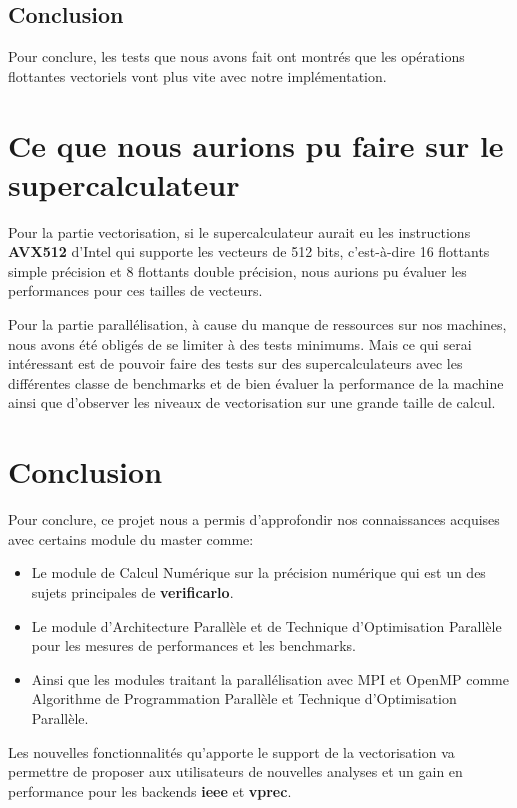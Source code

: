 \documentclass[11pt, letterpaper]{article}
\begin{document}
\subsection{Conclusion}
\label{sec:org1785040}

Pour conclure, les tests que nous avons fait ont montrés que les opérations
flottantes vectoriels vont plus vite avec notre implémentation.

\section{Ce que nous aurions pu faire sur le supercalculateur}
\label{sec:org5a4ae0a}

Pour la partie vectorisation, si le supercalculateur aurait eu les
instructions \textbf{AVX512} d'Intel qui supporte les vecteurs de 512 bits,
c'est-à-dire 16 flottants simple précision et 8 flottants double précision,
nous aurions pu évaluer les performances pour ces tailles de vecteurs.

Pour la partie parallélisation, à cause du manque de ressources sur nos
machines, nous avons été obligés de se limiter à des tests minimums. Mais ce
qui serai intéressant est de pouvoir faire des tests sur des supercalculateurs
avec les différentes classe de benchmarks et de bien évaluer la performance de
la machine ainsi que d'observer les niveaux de vectorisation sur une grande
taille de calcul.

\section{Conclusion}
\label{sec:org4b8e0be}

Pour conclure, ce projet nous a permis d'approfondir nos connaissances acquises
avec certains module du master comme:
\begin{itemize}
\item Le module de Calcul Numérique sur la précision numérique qui est un des sujets
principales de \textbf{verificarlo}.
\item Le module d'Architecture Parallèle et de Technique d'Optimisation Parallèle
pour les mesures de performances et les benchmarks.
\item Ainsi que les modules traitant la parallélisation avec MPI et OpenMP comme
Algorithme de Programmation Parallèle et Technique d'Optimisation Parallèle.
\end{itemize}

Les nouvelles fonctionnalités qu'apporte le support de la vectorisation va
permettre de proposer aux utilisateurs de nouvelles analyses et un gain en
performance pour les backends \textbf{ieee} et \textbf{vprec}.
\end{document}
